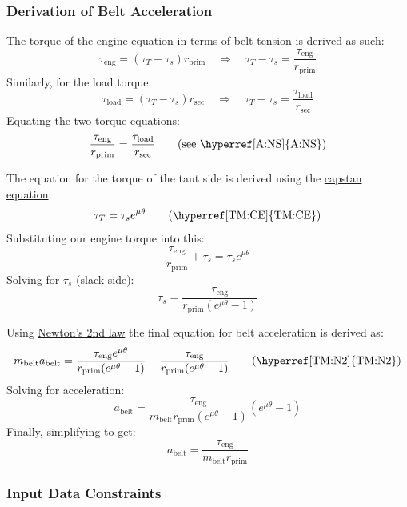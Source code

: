 \documentclass[12pt]{article}
\newcommand{\hpref}[1]{\hyperref[#1]{#1}}
\begin{document}
\subsubsection*{Derivation of Belt Acceleration}

The torque of the engine equation in terms of belt tension is derived as such: \\
\[\tau_{\text{eng}} = (\tau_T - \tau_s) r_{\text{prim}} \quad \Rightarrow \quad \tau_T - \tau_s = \frac{\tau_{\text{eng}}}{r_{\text{prim}}}\] %
Similarly, for the load torque: \\
\[\tau_{\text{load}} = (\tau_T - \tau_s) r_{\text{sec}} \quad \Rightarrow \quad \tau_T - \tau_s = \frac{\tau_{\text{load}}}{r_{\text{sec}}}\] %
Equating the two torque equations: \\
\[\frac{\tau_{\text{eng}}}{r_{\text{prim}}} = \frac{\tau_{\text{load}}}{r_{\text{sec}}} \tag*{\text{(see \hpref{A:NS})}}\] 
{\newline}

The equation for the torque of the taut side is derived using the \hyperref[TM:CE]{capstan equation}:
\[\tau_T = \tau_s e^{\mu \theta} \tag*{\text{(\hyperref[TM:CE]{TM:CE})}}\]
Substituting our engine torque into this: \\
\[\frac{\tau_{\text{eng}}}{r_{\text{prim}}} + \tau_s = \tau_s e^{\mu \theta}\]
Solving for \(\tau_s\) (slack side): \\
\[\tau_s = \frac{\tau_{\text{eng}}}{r_{\text{prim}} (e^{\mu \theta} - 1)}\]
{\newline}

Using \hyperref[TM:N2]{Newton's 2nd law} the final equation for belt acceleration is derived as: \\
\[m_\text{belt} a_{\text{belt}} = \frac{\tau_{\text{eng}} e^{\mu \theta}}{r_{\text{prim}} (e^{\mu \theta} - 1)} - \frac{\tau_{\text{eng}}}{r_{\text{prim}} (e^{\mu \theta} - 1)}  \tag*{\text{(\hyperref[TM:N2]{TM:N2})}}\]
Solving for acceleration: \\
\[a_{\text{belt}} = \frac{\tau_{\text{eng}}}{m_\text{belt} r_{\text{prim}} (e^{\mu \theta} - 1)} (e^{\mu \theta} - 1)\]
Finally, simplifying to get: \\
\[a_{\text{belt}} = \frac{\tau_{\text{eng}}}{m_\text{belt} r_{\text{prim}}}\]



\subsubsection{Input Data Constraints} \label{sec_DataConstraints}    
\end{document}
